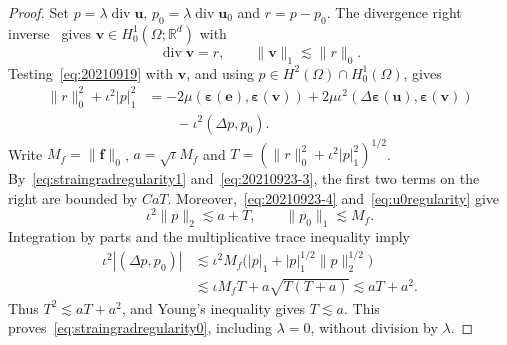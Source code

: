 \documentclass[10pt]{amsart}
\renewcommand{\div}{\operatorname{div}}
\numberwithin{equation}{section}
\begin{document}
\begin{proof}
Set $p=\lambda\div\boldsymbol u$, $p_0=\lambda\div\boldsymbol u_0$ and $r=p-p_0$. The divergence right inverse~\cite[Theorem~1.1]{CostabelMcIntosh2010} gives $\boldsymbol v\in H_0^1(\Omega;\mathbb R^d)$ with
\begin{equation}\label{eq:20210923-3}
\div\boldsymbol v=r,\qquad\|\boldsymbol v\|_1\lesssim\|r\|_0.
\end{equation}
Testing~\eqref{eq:20210919} with $\boldsymbol v$, and using $p\in H^2(\Omega)\cap H_0^1(\Omega)$, gives
\begin{equation}\label{eq:20211217}
\begin{aligned}
\|r\|_0^2+\iota^2|p|_1^2
&=-2\mu(\boldsymbol\varepsilon(\boldsymbol e),\boldsymbol\varepsilon(\boldsymbol v))
+2\mu\iota^2(\Delta\boldsymbol\varepsilon(\boldsymbol u),\boldsymbol\varepsilon(\boldsymbol v))\\
&\qquad-\iota^2(\Delta p,p_0).
\end{aligned}
\end{equation}
Write $M_f=\|\boldsymbol f\|_0$, $a=\sqrt\iota M_f$ and $T=(\|r\|_0^2+\iota^2|p|_1^2)^{1/2}$. By~\eqref{eq:straingradregularity1} and~\eqref{eq:20210923-3}, the first two terms on the right are bounded by $CaT$. Moreover,~\eqref{eq:20210923-4} and~\eqref{eq:u0regularity} give
\[
\iota^2\|p\|_2\lesssim a+T,\qquad\|p_0\|_1\lesssim M_f.
\]
Integration by parts and the multiplicative trace inequality imply
\begin{align*}
\iota^2|(\Delta p,p_0)|
&\lesssim\iota^2M_f\big(|p|_1+|p|_1^{1/2}\|p\|_2^{1/2}\big)\\
&\lesssim\iota M_fT+a\sqrt{T(T+a)}\lesssim aT+a^2.
\end{align*}
Thus $T^2\lesssim aT+a^2$, and Young's inequality gives $T\lesssim a$. This proves~\eqref{eq:straingradregularity0}, including $\lambda=0$, without division by $\lambda$.
\end{proof}
\end{document}
